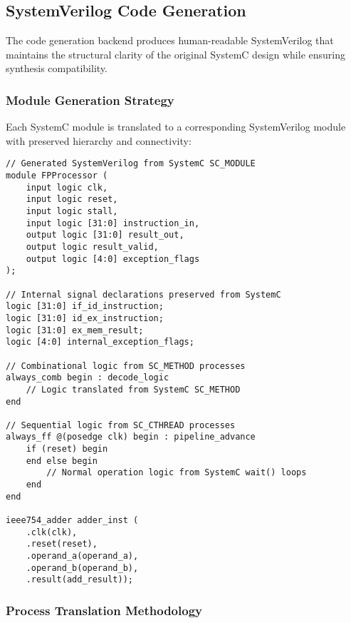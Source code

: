 \subsection{SystemVerilog Code Generation}
\label{subsec:systemverilog_generation}

The code generation backend produces human-readable SystemVerilog that maintains the structural clarity of the original SystemC design while ensuring synthesis compatibility.

\subsubsection{Module Generation Strategy}
\label{subsubsec:module_generation}

Each SystemC module is translated to a corresponding SystemVerilog module with preserved hierarchy and connectivity:

\begin{lstlisting}[caption={Module Translation Example},label=lst:module_translation]
// Generated SystemVerilog from SystemC SC_MODULE
module FPProcessor (
    input logic clk,
    input logic reset,
    input logic stall,
    input logic [31:0] instruction_in,
    output logic [31:0] result_out,
    output logic result_valid,
    output logic [4:0] exception_flags
);

// Internal signal declarations preserved from SystemC
logic [31:0] if_id_instruction;
logic [31:0] id_ex_instruction;
logic [31:0] ex_mem_result;
logic [4:0] internal_exception_flags;

// Combinational logic from SC_METHOD processes
always_comb begin : decode_logic
    // Logic translated from SystemC SC_METHOD
end

// Sequential logic from SC_CTHREAD processes  
always_ff @(posedge clk) begin : pipeline_advance
    if (reset) begin
    end else begin
        // Normal operation logic from SystemC wait() loops
    end
end

ieee754_adder adder_inst (
    .clk(clk),
    .reset(reset),
    .operand_a(operand_a),
    .operand_b(operand_b),
    .result(add_result));

\end{lstlisting}

\subsubsection{Process Translation Methodology}
\label{subsubsec:process_translation}

